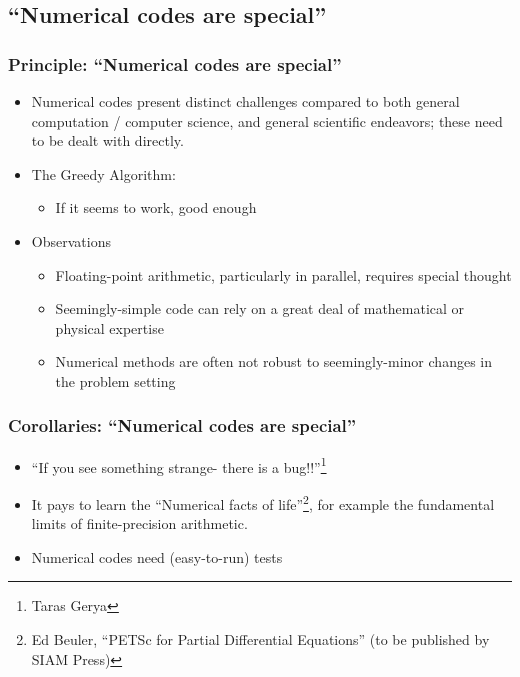 \documentclass{beamer}
\begin{document}
\subsection{``Numerical codes are special''}
\begin{frame}[fragile]
\frametitle{Principle: ``Numerical codes are special''}
\begin{itemize}
  \item Numerical codes present distinct challenges compared to both general computation / computer science, and general scientific endeavors; these need to be dealt with directly.
\item The Greedy Algorithm:
\begin{itemize}
\item If it seems to work, good enough
\end{itemize}
\item Observations
\begin{itemize}
\item Floating-point arithmetic, particularly in parallel, requires special thought
\item Seemingly-simple code can rely on a great deal of mathematical or physical expertise
\item Numerical methods are often not robust to seemingly-minor changes in the problem setting
\end{itemize}
\end{itemize}
\end{frame}

\begin{frame}[fragile]
\frametitle{Corollaries: ``Numerical codes are special''}
\begin{itemize}
  \item ``If you see something strange- there is a bug!!''\footnote{Taras Gerya} %
  \item It pays to learn the ``Numerical facts of life''\footnote{Ed Beuler, ``PETSc for Partial Differential Equations'' (to be published by SIAM Press)}, for example the fundamental limits of finite-precision arithmetic.
  \item Numerical codes need (easy-to-run) tests
\end{itemize}
\end{frame}
\end{document}
